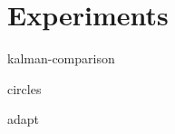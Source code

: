 \documentclass[class=article, crop=false]{standalone}
\begin{document}
\chapter{Experiments}\label{cha:experiments}

{kalman-comparison}

{circles}

{adapt}
\end{document}
